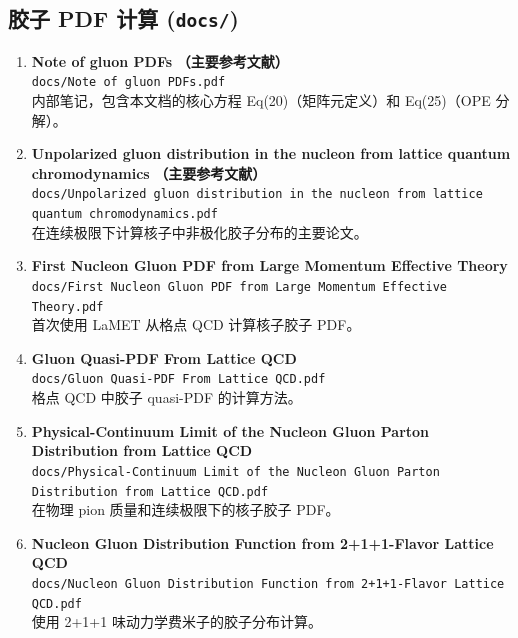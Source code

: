 \documentclass[12pt,a4paper]{ctexart}
\begin{document}
\subsection{胶子 PDF 计算 (\texttt{docs/})}

\begin{enumerate}
    \item \textbf{Note of gluon PDFs} \hfill \textbf{（主要参考文献）} \\
    \texttt{docs/Note of gluon PDFs.pdf} \\
    内部笔记，包含本文档的核心方程 Eq(20)（矩阵元定义）和 Eq(25)（OPE 分解）。

    \item \textbf{Unpolarized gluon distribution in the nucleon from lattice quantum chromodynamics} \hfill \textbf{（主要参考文献）} \\
    \texttt{docs/Unpolarized gluon distribution in the nucleon from lattice quantum chromodynamics.pdf} \\
    在连续极限下计算核子中非极化胶子分布的主要论文。

    \item \textbf{First Nucleon Gluon PDF from Large Momentum Effective Theory} \\
    \texttt{docs/First Nucleon Gluon PDF from Large Momentum Effective Theory.pdf} \\
    首次使用 LaMET 从格点 QCD 计算核子胶子 PDF。

    \item \textbf{Gluon Quasi-PDF From Lattice QCD} \\
    \texttt{docs/Gluon Quasi-PDF From Lattice QCD.pdf} \\
    格点 QCD 中胶子 quasi-PDF 的计算方法。

    \item \textbf{Physical-Continuum Limit of the Nucleon Gluon Parton Distribution from Lattice QCD} \\
    \texttt{docs/Physical-Continuum Limit of the Nucleon Gluon Parton Distribution from Lattice QCD.pdf} \\
    在物理 pion 质量和连续极限下的核子胶子 PDF。

    \item \textbf{Nucleon Gluon Distribution Function from 2+1+1-Flavor Lattice QCD} \\
    \texttt{docs/Nucleon Gluon Distribution Function from 2+1+1-Flavor Lattice QCD.pdf} \\
    使用 2+1+1 味动力学费米子的胶子分布计算。


\end{enumerate}
\end{document}
